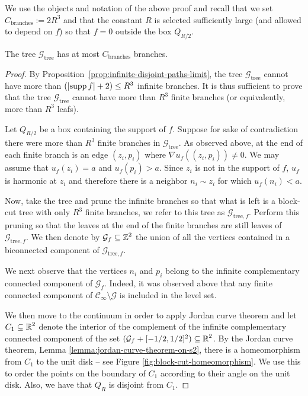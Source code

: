 \documentclass[12pt]{amsart}
\numberwithin{equation}{section}
\begin{document}
	
	We use the objects and notation of the above proof and recall that we set $C_{\mathrm{branches}} := 2 R^3$ and that the constant $R$ is selected sufficiently large (and allowed to depend on $f$) so that $f = 0$ outside the box $Q_{R/2}$.
	
	\begin{lemma} \label{lemma:finite-branches}
		The tree $\mathcal{G}_{\mathrm{tree}}$ has at most $C_{\mathrm{branches}}$ branches.
	\end{lemma}
	\begin{proof}
		By Proposition~\ref{prop:infinite-disjoint-paths-limit}, the tree $\mathcal{G}_{\mathrm{tree}}$ cannot have more than $(\left| \mathrm{supp\,} f \right| + 2) \leq R^3$ infinite branches. It is thus sufficient to prove that the tree $\mathcal{G}_{\mathrm{tree}}$ cannot have more than $R^3$ finite branches (or equivalently, more than $R^3$ leafs).
		
		Let $Q_{R/2}$ be a box containing the support of $f$. Suppose for sake of contradiction there were more than
		$R^3$ finite branches in $\mathcal{G}_{\mathrm{tree}}$. As observed above, at the end of each finite branch 
		is an edge $(z_i, p_i)$ where $\nabla u_f((z_i, p_i)) \neq 0$. We may assume that $u_f(z_i) = a$ and $u_f(p_i) > a$. 
		Since $z_i$ is not in the support of $f$, $u_f$ is harmonic at $z_i$ and therefore there is a neighbor $n_i \sim z_i$
		for which $u_f(n_i) < a$.
		
		Now, take the tree and prune the infinite branches so that what is left is a block-cut tree 
		with only $R^3$ finite branches, we refer to this tree as $\mathcal{G}_{\mathrm{tree}, f}$. Perform this pruning so that the leaves at the end of the finite branches are still leaves of $\mathcal{G}_{\mathrm{tree}, f}$. We then denote by $\mathcal{G}_{f} \subseteq \operatorname{\mathbb{Z}}^2$ the union of all the vertices contained in a biconnected component of $\mathcal{G}_{\mathrm{tree}, f}$.
		
		
		We next observe that the vertices $n_i$ and $p_i$ belong to the infinite complementary connected component of $\mathcal{G}_{f}$. 
		Indeed, it was observed above that any finite connected component of $\mathscr{C}_{\infty} \setminus \mathcal{G}$ is included in the level set.
		
		We then move to the continuum in order to apply Jordan curve theorem and let $C_1 \subseteq \operatorname{\mathbb{R}}^2$ denote the interior of the complement of the infinite complementary connected component of the set $(\mathcal{G}_{f} + [-1/2 , 1/2]^2) \subseteq \operatorname{\mathbb{R}}^2$. By the Jordan curve theorem, Lemma \ref{lemma:jordan-curve-theorem-on-s2}, there is a homeomorphism from $C_1$ to the unit disk -- see Figure \ref{fig:block-cut-homeomorphism}. We use this to order the points on the boundary of $C_1$ according to their angle on the unit disk.  Also, we have that $Q_R$ is disjoint from $C_1$. 
		

\end{proof}
\end{document}
